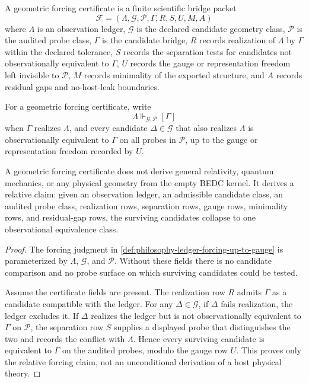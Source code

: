 \begin{definition}
\label{def:philosophy-geometric-forcing-certificate}
A geometric forcing certificate is a finite scientific bridge packet
$$
\mathcal{F}=(\Lambda,\mathcal{G},\mathcal{P},\Gamma,R,S,U,M,A)
$$
where $\Lambda$ is an observation ledger, $\mathcal{G}$ is the declared
candidate geometry class, $\mathcal{P}$ is the audited probe class, $\Gamma$
is the candidate bridge, $R$ records realization of $\Lambda$ by $\Gamma$
within the declared tolerance, $S$ records the separation tests for candidates
not observationally equivalent to $\Gamma$, $U$ records the gauge or
representation freedom left invisible to $\mathcal{P}$, $M$ records
minimality of the exported structure, and $A$ records residual gaps and
no-host-leak boundaries.
\end{definition}

\begin{definition}
\label{def:philosophy-ledger-forcing-up-to-gauge}
For a geometric forcing certificate, write
$$
\Lambda\Vdash_{\mathcal{G},\mathcal{P}}[\Gamma]
$$
when $\Gamma$ realizes $\Lambda$, and every candidate
$\Delta\in\mathcal{G}$ that also realizes $\Lambda$ is observationally
equivalent to $\Gamma$ on all probes in $\mathcal{P}$, up to the gauge
or representation freedom recorded by $U$.
\end{definition}

\begin{theorem}
\label{thm:philosophy-geometric-forcing-not-empty-kernel-derivation}
A geometric forcing certificate does not derive general relativity, quantum
mechanics, or any physical geometry from the empty BEDC kernel. It derives a
relative claim: given an observation ledger, an admissible candidate class,
an audited probe class, realization rows, separation rows, gauge rows,
minimality rows, and residual-gap rows, the surviving candidates collapse to
one observational equivalence class.
\end{theorem}
\begin{proof}
The forcing judgment in \autoref{def:philosophy-ledger-forcing-up-to-gauge}
is parameterized by $\Lambda$, $\mathcal{G}$, and $\mathcal{P}$. Without these
fields there is no candidate comparison and no probe surface on which
surviving candidates could be tested.

Assume the certificate fields are present. The realization row $R$ admits
$\Gamma$ as a candidate compatible with the ledger. For any
$\Delta\in\mathcal{G}$, if $\Delta$ fails realization, the ledger excludes it.
If $\Delta$ realizes the ledger but is not observationally equivalent to
$\Gamma$ on $\mathcal{P}$, the separation row $S$ supplies a displayed probe
that distinguishes the two and records the conflict with $\Lambda$. Hence
every surviving candidate is equivalent to $\Gamma$ on the audited probes,
modulo the gauge row $U$. This proves only the relative forcing claim, not an
unconditional derivation of a host physical theory.
\end{proof}

